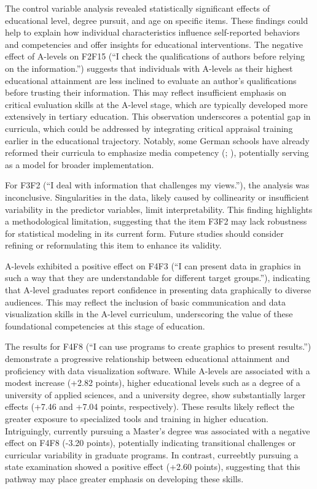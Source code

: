 \documentclass[
  12pt,
  a4paper,
  twoside]{article}
\begin{document}
The control variable analysis revealed statistically significant effects of educational level, degree pursuit, and age on specific items. These findings could help to explain how individual characteristics influence self-reported behaviors and competencies and offer insights for educational interventions.
The negative effect of A-levels on F2F15 (``I check the qualifications of authors before relying on the information.'') suggests that individuals with A-levels as their highest educational attainment are less inclined to evaluate an author's qualifications before trusting their information. This may reflect insufficient emphasis on critical evaluation skills at the A-level stage, which are typically developed more extensively in tertiary education. This observation underscores a potential gap in curricula, which could be addressed by integrating critical appraisal training earlier in the educational trajectory. Notably, some German schools have already reformed their curricula to emphasize media competency (; ), potentially serving as a model for broader implementation.

For F3F2 (``I deal with information that challenges my views.''), the analysis was inconclusive. Singularities in the data, likely caused by collinearity or insufficient variability in the predictor variables, limit interpretability. This finding highlights a methodological limitation, suggesting that the item F3F2 may lack robustness for statistical modeling in its current form. Future studies should consider refining or reformulating this item to enhance its validity.

A-levels exhibited a positive effect on F4F3 (``I can present data in graphics in such a way that they are understandable for different target groups.''), indicating that A-level graduates report confidence in presenting data graphically to diverse audiences. This may reflect the inclusion of basic communication and data visualization skills in the A-level curriculum, underscoring the value of these foundational competencies at this stage of education.

The results for F4F8 (``I can use programs to create graphics to present results.'') demonstrate a progressive relationship between educational attainment and proficiency with data visualization software. While A-levels are associated with a modest increase (+2.82 points), higher educational levels such as a degree of a university of applied sciences, and a university degree, show substantially larger effects (+7.46 and +7.04 points, respectively). These results likely reflect the greater exposure to specialized tools and training in higher education. Intriguingly, currently pursuing a Master's degree was associated with a negative effect on F4F8 (-3.20 points), potentially indicating transitional challenges or curricular variability in graduate programs. In contrast, curreebtly pursuing a state examination showed a positive effect (+2.60 points), suggesting that this pathway may place greater emphasis on developing these skills.
\end{document}
